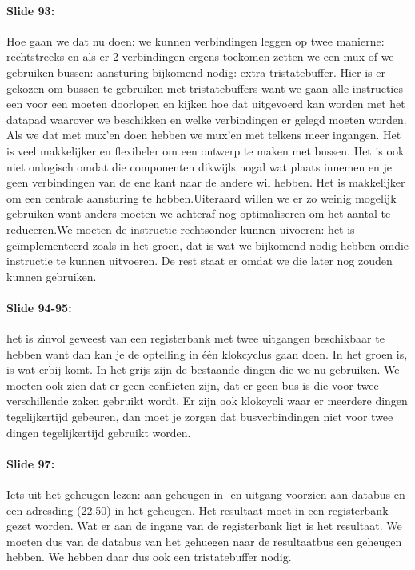 \documentclass[10pt,a4paper]{book}
\begin{document}
\paragraph{Slide 93:} Hoe gaan we dat nu doen: we kunnen verbindingen leggen op twee manierne: rechtstreeks en als er 2 verbindingen ergens toekomen zetten we een mux of we gebruiken bussen: aansturing bijkomend nodig: extra tristatebuffer. Hier is er gekozen om bussen te gebruiken met tristatebuffers want we gaan alle instructies een voor een moeten doorlopen en kijken hoe dat uitgevoerd kan worden met het datapad waarover we beschikken en welke verbindingen er gelegd moeten worden. Als we dat met mux'en doen hebben we mux'en met telkens meer ingangen. Het is veel makkelijker en flexibeler om een ontwerp te maken met bussen. Het is ook niet onlogisch omdat die componenten dikwijls nogal wat plaats innemen en je geen verbindingen van de ene kant naar de andere wil hebben. Het is makkelijker om een centrale aansturing te hebben.Uiteraard willen we er zo weinig mogelijk gebruiken want anders moeten we achteraf nog optimaliseren om het aantal te reduceren.We moeten de instructie rechtsonder kunnen uivoeren: het is ge\"implementeerd zoals in het groen, dat is wat we bijkomend nodig hebben omdie instructie te kunnen uitvoeren. De rest staat er omdat we die later nog zouden kunnen gebruiken.

\paragraph{Slide 94-95:} het is zinvol geweest van een registerbank met twee uitgangen beschikbaar te hebben want dan kan je de optelling in \'e\'en klokcyclus gaan doen. In het groen is, is wat erbij komt. In het grijs zijn de bestaande dingen die we nu gebruiken. We moeten ook zien dat er geen conflicten zijn, dat er geen bus is die voor twee verschillende zaken gebruikt wordt. Er zijn ook klokcycli waar er meerdere dingen tegelijkertijd gebeuren, dan moet je zorgen dat busverbindingen niet voor twee dingen tegelijkertijd gebruikt worden.

\paragraph{Slide 97:} Iets uit het geheugen lezen: aan geheugen in- en uitgang voorzien aan databus en een adresding (22.50) in het geheugen. Het resultaat moet in een registerbank gezet worden. Wat er aan de ingang van de registerbank ligt is het resultaat. We moeten dus van de databus van het gehuegen naar de resultaatbus een geheugen hebben. We hebben daar dus ook een tristatebuffer nodig.
\end{document}
